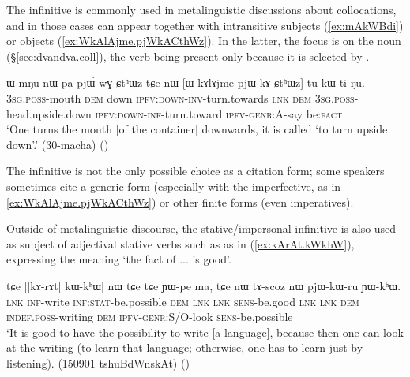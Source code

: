 The infinitive is commonly used in metalinguistic discussions about collocations, and in those cases can appear together with intransitive subjects (\ref{ex:mAkWBdi}) or objects (\ref{ex:WkAlAjme.pjWkACthWz}). In the latter, the focus is on the noun  (§\ref{sec:dvandva.coll}), the verb  being present only because it is selected by .

\begin{exe}
\ex \label{ex:WkAlAjme.pjWkACthWz}
 \gll  ɯ-mŋu nɯ pa pjɯ́-wɣ-ɕtʰɯz tɕe nɯ [ɯ-kɤlɤjme pjɯ-kɤ-ɕtʰɯz] tu-kɯ-ti ŋu. \\
\textsc{3sg}.\textsc{poss}-mouth \textsc{dem} down \textsc{ipfv}:\textsc{down}-\textsc{inv}-turn.towards \textsc{lnk} \textsc{dem}  \textsc{3sg}.\textsc{poss}-head.upside.down   \textsc{ipfv}:\textsc{down}-\textsc{inf}-turn.toward \textsc{ipfv}-\textsc{genr}:A-say be:\textsc{fact}  \\
\glt `One turns the mouth [of the container] downwards, it is called `to turn upside down'.' (30-macha)
()
\end{exe}

The infinitive is not the only possible choice as a citation form; some speakers sometimes cite a generic form (especially with the imperfective, as  in \ref{ex:WkAlAjme.pjWkACthWz}) or other finite forms (even imperatives).

Outside of metalinguistic discourse, the stative/impersonal infinitive is also used as subject of adjectival stative verbs such as  as in (\ref{ex:kArAt.kWkhW}), expressing the meaning `the fact of ... is good'.

\begin{exe}
\ex \label{ex:kArAt.kWkhW}
 \gll tɕe [[kɤ-rɤt] kɯ-kʰɯ] nɯ tɕe tɕe ɲɯ-pe ma, tɕe nɯ tɤ-scoz nɯ pjɯ-kɯ-ru ɲɯ-kʰɯ. \\
 \textsc{lnk} \textsc{inf}-write \textsc{inf}:\textsc{stat}-be.possible \textsc{dem} \textsc{lnk} \textsc{lnk} \textsc{sens}-be.good \textsc{lnk} \textsc{lnk} \textsc{dem} \textsc{indef}.\textsc{poss}-writing \textsc{dem} \textsc{ipfv}-\textsc{genr}:S/O-look \textsc{sens}-be.possible \\
 \glt `It is good to have the possibility to write [a language], because then one can look at the writing (to learn that language; otherwise, one has to learn just by listening). (150901 tshuBdWnskAt)
()
\end{exe}

